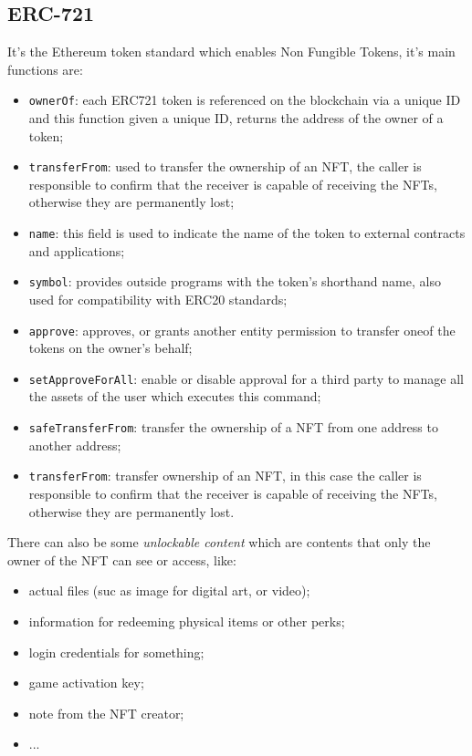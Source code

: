 \subsection{ERC-721}
It's the Ethereum token standard which enables Non Fungible Tokens, it's main functions are:
\begin{itemize}
    \item \verb|ownerOf|: each ERC721 token is referenced on the blockchain via a unique ID and this function given a unique ID, returns the address of the owner of a token;
    \item \verb|transferFrom|: used to transfer the ownership of an NFT, the caller is responsible to confirm that the receiver is capable of receiving the NFTs, otherwise they are permanently lost;
    \item \verb|name|: this field is used to indicate the name of the token to external contracts and applications;
    \item \verb|symbol|: provides outside programs with the token's shorthand name, also used for compatibility with ERC20 standards;
    \item \verb|approve|: approves, or grants another entity permission to transfer oneof the tokens on the owner's behalf;
    \item \verb|setApproveForAll|: enable or disable approval for a third party to manage all the assets of the user which executes this command;
    \item \verb|safeTransferFrom|: transfer the ownership of a NFT from one address to another address;
    \item \verb|transferFrom|: transfer ownership of an NFT, in this case the caller is responsible to confirm that the receiver is capable of receiving the NFTs, otherwise they are permanently lost.
\end{itemize}

There can also be some \emph{unlockable content} which are contents that only the owner of the NFT can see or access, like:
\begin{itemize}
    \item actual files (suc as image for digital art, or video);
    \item information for redeeming physical items or other perks;
    \item login credentials for something;
    \item game activation key;
    \item note from the NFT creator;
    \item ...
\end{itemize}

